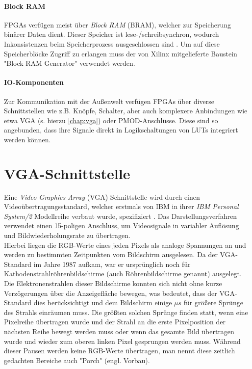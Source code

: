 \documentclass[a4paper,12pt,onesided]{report}
\begin{document}
\paragraph{Block RAM}
FPGAs verfügen meist über \textit{Block RAM} (BRAM), welcher zur Speicherung binärer Daten dient. Dieser Speicher ist lese-/schreibsynchron, wodurch Inkonsistenzen beim Speicherprozess ausgeschlossen sind \cite[S. 11]{bram}. Um auf diese Speicherblöcke Zugriff zu erlangen muss der von Xilinx mitgelieferte Baustein "Block RAM Generator" verwendet werden.

\paragraph{IO-Komponenten}
Zur Kommunikation mit der Außenwelt verfügen FPGAs über diverse Schnittstellen wie z.B. Knöpfe, Schalter, aber auch komplexere Anbindungen wie etwa VGA (s. hierzu \autoref{chap:vga}) oder PMOD-Anschlüsse. %
Diese sind so angebunden, dass ihre Signale direkt in Logikschaltungen von LUTs integriert werden können.


\section{VGA-Schnittstelle}
\label{chap:vga}
Eine \textit{Video Graphics Array} (VGA) Schnittstelle wird durch einen Videoübertragungsstandard, welcher erstmals von IBM in ihrer \textit{IBM Personal System/2} Modellreihe verbaut wurde, spezifiziert \cite{ibmTimeline}. 
Das Darstellungsverfahren verwendet einen 15-poligen Anschluss, um Videosignale in variabler Auflösung und Bildwiederholungsrate zu übertragen.\\
Hierbei liegen die RGB-Werte eines jeden Pixels als analoge Spannungen an und werden zu bestimmten Zeitpunkten vom Bildschirm ausgelesen. 
Da der VGA-Standard im Jahre 1987 aufkam, war er ursprünglich noch für  Kathodenstrahlröhrenbildschirme (auch Röhrenbildschirme genannt) ausgelegt. 
Die Elektronenstrahlen dieser Bildschirme konnten sich nicht ohne kurze Verzögerungen über die Anzeigefläche bewegen, was bedeutet, dass der VGA-Standard dies berücksichtigt und dem Bildschirm einige $\mu s$ für größere Sprünge des Strahls einräumen muss.
Die größten solchen Sprünge finden statt, wenn eine Pixelreihe übertragen wurde und der Strahl an die erste Pixelposition der nächsten Reihe bewegt werden muss oder wenn das gesamte Bild übertragen wurde und wieder zum oberen linken Pixel gesprungen werden muss.
Während dieser Pausen werden keine RGB-Werte übertragen, man nennt diese zeitlich gedachten Bereiche auch "Porch" (engl. Vorbau).\\
\end{document}
